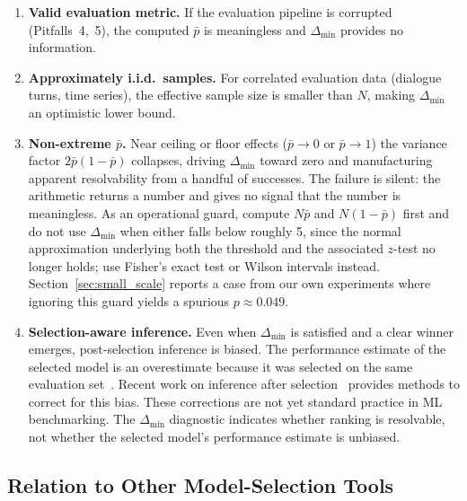 \documentclass[pdflatex,sn-mathphys-ay,iicol]{sn-jnl}
\theoremstyle{thmstylethree}
\begin{document}
\begin{table}[t]
\begin{table}[t]
\begin{enumerate}
    \item \textbf{Valid evaluation metric.} If the evaluation pipeline is corrupted (Pitfalls~4,~5), the computed $\bar{p}$ is meaningless and $\Delta_{\min}$ provides no information.
    \item \textbf{Approximately i.i.d.\ samples.} For correlated evaluation data (dialogue turns, time series), the effective sample size is smaller than $N$, making $\Delta_{\min}$ an optimistic lower bound.
    \item \textbf{Non-extreme $\bar{p}$.} Near ceiling or floor effects ($\bar{p}\to0$ or $\bar{p}\to1$) the variance factor $2\bar{p}(1-\bar{p})$ collapses, driving $\Delta_{\min}$ toward zero and manufacturing apparent resolvability from a handful of successes. The failure is silent: the arithmetic returns a number and gives no signal that the number is meaningless. As an operational guard, compute $N\bar{p}$ and $N(1-\bar{p})$ first and do not use $\Delta_{\min}$ when either falls below roughly 5, since the normal approximation underlying both the threshold and the associated $z$-test no longer holds; use Fisher's exact test or Wilson intervals instead. Section~\ref{sec:small_scale} reports a case from our own experiments where ignoring this guard yields a spurious $p\approx0.049$.
    \item \textbf{Selection-aware inference.} Even when $\Delta_{\min}$ is satisfied and a clear winner emerges, post-selection inference is biased. The performance estimate of the selected model is an overestimate because it was selected on the same evaluation set~\citep{leeb2005model}. Recent work on inference after selection~\citep{zrnic2024flexible,zhang2024winners} provides methods to correct for this bias. These corrections are not yet standard practice in ML benchmarking. The $\Delta_{\min}$ diagnostic indicates whether ranking is resolvable, not whether the selected model's performance estimate is unbiased.
\end{enumerate}

\subsection{Relation to Other Model-Selection Tools}


\end{table}
\end{table}
\end{document}
